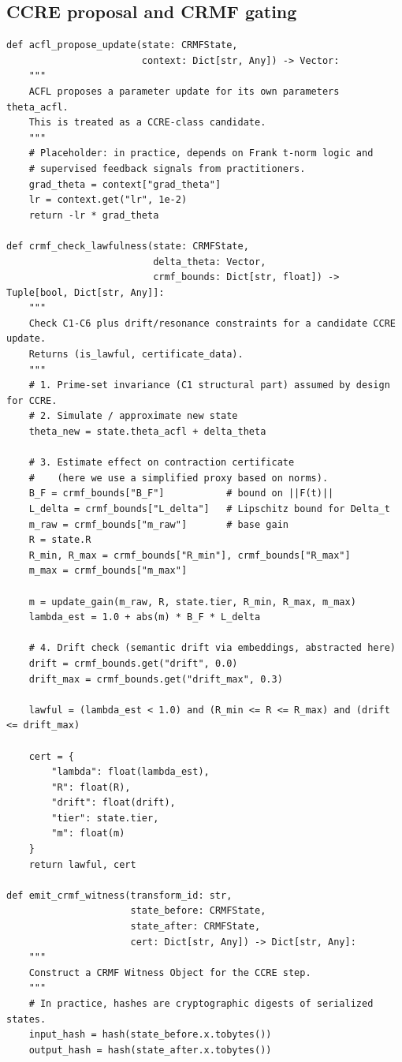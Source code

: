 \documentclass[11pt]{article}
\begin{document}
\subsection{CCRE proposal and CRMF gating}

\begin{verbatim}
def acfl_propose_update(state: CRMFState,
                        context: Dict[str, Any]) -> Vector:
    """
    ACFL proposes a parameter update for its own parameters theta_acfl.
    This is treated as a CCRE-class candidate.
    """
    # Placeholder: in practice, depends on Frank t-norm logic and
    # supervised feedback signals from practitioners.
    grad_theta = context["grad_theta"]
    lr = context.get("lr", 1e-2)
    return -lr * grad_theta

def crmf_check_lawfulness(state: CRMFState,
                          delta_theta: Vector,
                          crmf_bounds: Dict[str, float]) -> Tuple[bool, Dict[str, Any]]:
    """
    Check C1-C6 plus drift/resonance constraints for a candidate CCRE update.
    Returns (is_lawful, certificate_data).
    """
    # 1. Prime-set invariance (C1 structural part) assumed by design for CCRE.
    # 2. Simulate / approximate new state
    theta_new = state.theta_acfl + delta_theta

    # 3. Estimate effect on contraction certificate
    #    (here we use a simplified proxy based on norms).
    B_F = crmf_bounds["B_F"]           # bound on ||F(t)||
    L_delta = crmf_bounds["L_delta"]   # Lipschitz bound for Delta_t
    m_raw = crmf_bounds["m_raw"]       # base gain
    R = state.R
    R_min, R_max = crmf_bounds["R_min"], crmf_bounds["R_max"]
    m_max = crmf_bounds["m_max"]

    m = update_gain(m_raw, R, state.tier, R_min, R_max, m_max)
    lambda_est = 1.0 + abs(m) * B_F * L_delta

    # 4. Drift check (semantic drift via embeddings, abstracted here)
    drift = crmf_bounds.get("drift", 0.0)
    drift_max = crmf_bounds.get("drift_max", 0.3)

    lawful = (lambda_est < 1.0) and (R_min <= R <= R_max) and (drift <= drift_max)

    cert = {
        "lambda": float(lambda_est),
        "R": float(R),
        "drift": float(drift),
        "tier": state.tier,
        "m": float(m)
    }
    return lawful, cert

def emit_crmf_witness(transform_id: str,
                      state_before: CRMFState,
                      state_after: CRMFState,
                      cert: Dict[str, Any]) -> Dict[str, Any]:
    """
    Construct a CRMF Witness Object for the CCRE step.
    """
    # In practice, hashes are cryptographic digests of serialized states.
    input_hash = hash(state_before.x.tobytes())
    output_hash = hash(state_after.x.tobytes())


\end{verbatim}
\end{document}
